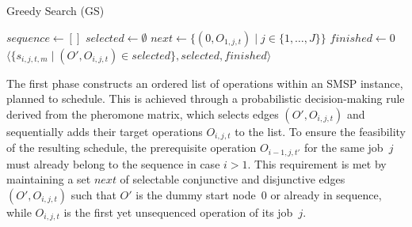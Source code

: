 \begin{algorithm}[t]
	\caption{Greedy Search (GS)}
	\label{gs}
	$\mathit{sequence}\leftarrow[]$\;
	$\mathit{selected}\leftarrow\emptyset$\;
	$\mathit{next}\leftarrow\{(0,O_{1,j,t}) \mid j\in\{1,\dots,J\}\}$\;
	\While{$\mathit{next}\neq\emptyset$}{
		\lForEach{$e\in\mathit{next}$}{%
		$p_e\leftarrow \frac{\tau_e}{\sum_{e'\in\mathit{next}}\tau_{e'}}$}
	Randomly select an edge $e$ based on $p_e$\;
	\For{selected edge $e=(O',O_{i,j,t})$}{
		$\mathit{sequence}.\mathrm{enqueue}(O_{i,j,t})$\;
		$\mathit{selected}\leftarrow\mathit{selected}\cup\{e\}$\;
		$\mathit{next}\leftarrow\{(O_1,O_2)\in\mathit{next} \mid O_2\neq O_{i,j,t}\}$\;
		$\begin{array}[b]{@{}r@{}l@{}}
			E \leftarrow {} &		
			\{(O_{i,j,t},O_{{i+1},j,t'}) \mid i<n_j\}
			\\ {} \cup {} &
			\{(O_{i,j,t},O_{i',j',t}) \mid (O_1,O_{i',j',t})\in\mathit{next}\}%
		\end{array}$\;
		$\mathit{next}\leftarrow\mathit{next}\cup E$\;
}}
$\mathit{finished}\leftarrow0$\;
\Return $\langle\{s_{i,j,t,m} \mid (O',O_{i,j,t})\in\mathit{selected}\},\mathit{selected}, \mathit{finished}\rangle$\;
\end{algorithm}

The first phase constructs an ordered list of operations within an SMSP instance, planned to schedule. This is achieved through a probabilistic decision-making rule derived from the pheromone matrix, which selects edges $(O',O_{i,j,t})$ and sequentially adds their target operations 
$O_{i,j,t}$ to the list. To ensure the feasibility of the resulting schedule, the prerequisite operation 
$O_{i-1,j,t'}$ for the same job~$j$ must already belong to the sequence in case $i>1$. 
This requirement is met by maintaining a set  $\mathit{next}$
of selectable conjunctive and disjunctive edges $(O',O_{i,j,t})$
such that $O'$ is the dummy start node~$0$ or already in sequence,
while $O_{i,j,t}$ is the first yet unsequenced operation of its job~$j$. 


